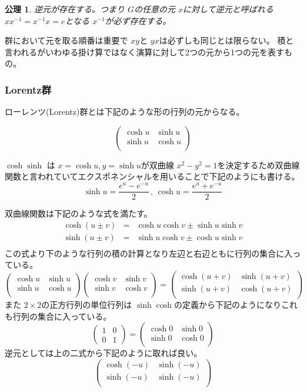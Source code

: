 \documentclass[dvipdfmx]{jsarticle}
\newtheorem{axio}{公理}
\begin{document}
\begin{axio}
  逆元が存在する。つまり $G$の任意の元 $x$に対して逆元と呼ばれる $xx^{-1} = x^{-1}x = e$となる $x^{-1}$が必ず存在する。
\end{axio}

群において元を取る順番は重要で $xy$と $yx$は必ずしも同じとは限らない。
積と言われるがいわゆる掛け算ではなく演算に対して2つの元から1つの元を表すもの。

\subsubsection{Lorentz群}
ローレンツ(Lorentz)群とは下記のような形の行列の元からなる。

\[
\begin{pmatrix}
    \cosh u & \sinh u \\
    \sinh u & \cosh u \\
\end{pmatrix}
\]

$ \cosh \sinh $ は $x = \cosh u , y = \sinh u $が双曲線 $x^2 - y^2 = 1$を決定するため双曲線関数と言われていてエクスポネンシャルを用いることで下記のようにも書ける。
\[
  \sinh u = \frac{e^u - e^{-u}}{2} \, , \, \cosh u = \frac{e^u + e^{-u}}{2}
\]

双曲線関数は下記のような式を満たす。
\begin{eqnarray*}
  \cosh (u \pm v) & = & \cosh u \cosh v \pm \sinh u \sinh v \\
  \sinh (u \pm v) & = & \sinh u \cosh v \pm \cosh u \sinh v \\
\end{eqnarray*}
この式より下のような行列の積の計算となり左辺と右辺ともに行列の集合に入っている。
\[
\begin{pmatrix}
  \cosh u & \sinh u \\
  \sinh u & \cosh u \\
\end{pmatrix}
\begin{pmatrix}
  \cosh v & \sinh v \\
  \sinh v & \cosh v \\
\end{pmatrix}
=
\begin{pmatrix}
  \cosh (u + v) & \sinh (u + v) \\
  \sinh (u + v) & \cosh (u + v) \\
\end{pmatrix}
\]
また $2 \times 2$の正方行列の単位行列は $\sinh \cosh$の定義から下記のようになりこれも行列の集合に入っている。
\[
\begin{pmatrix}
  1 & 0 \\
  0 & 1
\end{pmatrix}
=
\begin{pmatrix}
  \cosh 0 & \sinh 0 \\
  \sinh 0 & \cosh 0 \\
\end{pmatrix}
\]
逆元としては上の二式から下記のように取れば良い。
\[
\begin{pmatrix}
  \cosh (-u) & \sinh (-u) \\
  \sinh (-u) & \sinh (-u) \\
\end{pmatrix}
\]
\end{document}

